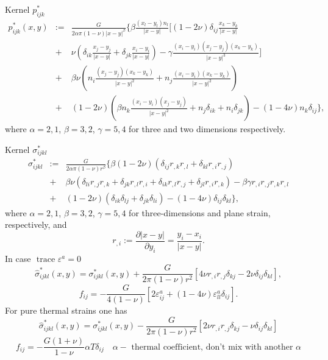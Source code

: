 \begin{definition}\label{eq:KernelPijk} Kernel $p^{*}_{ijk}$\\
\begin{eqnarray}
p^{*}_{ijk}(x,y)&:=&\frac{G}{2\alpha \pi (1-\nu) |x-y|^{\beta}}\{\beta \frac{(x_l-y_l)n_l}{|x-y|}[(1-2\nu)\delta_{ij}\frac{x_k-y_k}{|x-y|} \nonumber \\[2ex]
&+&\nu(\delta_{ik}\frac{x_j-y_j}{|x-y|}+\delta_{jk}\frac{x_i-y_i}{|x-y|})- \gamma \frac{(x_i-y_i)(x_j-y_j)(x_k-y_k)}{|x-y|^3}] \nonumber \\[2ex]
&+&\beta\nu(n_i \frac{(x_j-y_j)(x_k-y_k)}{|x-y|^2}+n_j\frac{(x_i-y_i)(x_k-y_k)}{|x-y|^2}) \nonumber \\[2ex]
&+&(1-2\nu)(\beta n_k \frac{(x_i-y_i)(x_j-y_j)}{|x-y|^2}+n_j \delta_{ik} +n_i \delta_{jk}) - (1-4\nu)n_k \delta_{ij}\},
\end{eqnarray}
where $\alpha=2,1$, $\beta=3,2$, $\gamma=5,4$ for three and two dimensions respectively. 
\end{definition}

\begin{definition} Kernel $\sigma^{*}_{ijkl}$\\
\begin{eqnarray}
\sigma^{*}_{ijkl}&:=&\frac{G}{2\alpha \pi (1-\nu)r^{\beta}}\{\beta(1-2\nu)(\delta_{ij}r_{,k}r_{,l}+\delta_{kl}r_{,i}r_{,j}) \nonumber \\
&+& \beta\nu(\delta_{li}r_{,j}r_{,k}+\delta_{jk}r_{,l}r_{,i}+\delta_{ik}r_{,l}r_{,j}+\delta_{jl}r_{,i}r_{,k})-\beta\gamma r_{,i}r_{,j}r_{,k}r_{,l} \nonumber \\
&+& (1-2\nu)(\delta_{ik}\delta_{lj}+\delta_{jk}\delta_{li})-(1-4\nu)\delta_{ij}\delta_{kl} \}, \nonumber
\end{eqnarray}
where $\alpha=2,1$, $\beta=3,2$, $\gamma=5,4$ for three-dimensions and plane strain, respectively, and
\begin{equation}\nonumber
r_{,i}:=\frac{\partial |x-y|}{\partial y_i}=\frac{y_i-x_i}{|x-y|}.
\end{equation}
In case $ \mbox{ trace } \varepsilon^a=0$
\begin{equation}
\hat{\sigma}^{*}_{ijkl}(x,y)=\sigma^{*}_{ijkl}(x,y)+\frac{G}{2\pi(1-\nu)r^2}[4\nu r_{,i}r_{,j}\delta_{kj}-2\nu \delta_{ij}\delta_{kl}],
\end{equation}
\begin{equation}
f_{ij}=-\frac{G}{4(1-\nu)}[2 \varepsilon^{a}_{ij}+(1-4\nu) \varepsilon^{a}_{ll}\delta_{ij}].
\end{equation}
For pure thermal strains one has
\begin{equation}
\hat{\sigma}^{*}_{ijkl}(x,y)=\sigma^{*}_{ijkl}(x,y)-\frac{G}{2\pi(1-\nu)r^2}[2\nu r_{,i}r_{,j}\delta_{kj}-\nu \delta_{ij}\delta_{kl}]
\end{equation}
\begin{equation}
f_{ij}=-\frac{G(1+\nu)}{1-\nu}\alpha T \delta_{ij} \quad \alpha -\mbox{ thermal coefficient, don't mix with another } \alpha
\end{equation} 
\end{definition}


